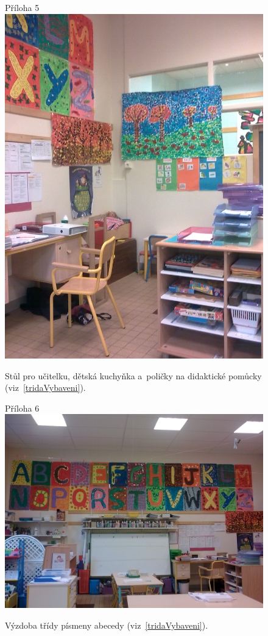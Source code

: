 	\begin{figure}[tb]
		\centering
		Příloha 5\\
		\includegraphics[height = 0.35\textheight]{./fotky/Obr5.jpg}
		\caption{
			Stůl pro učitelku, dětská kuchyňka a~poličky na didaktické pomůcky (viz~\ref{tridaVybaveni}).
		}
		\label{Obr5}
	\end{figure}

	\begin{figure}[tb]
		\centering
		Příloha 6\\
		\includegraphics[height = 0.35\textheight]{./fotky/Obr6.jpg}
		\caption{
			Výzdoba třídy písmeny abecedy (viz~\ref{tridaVybaveni}).
		}
		\label{Obr6}
	\end{figure}


